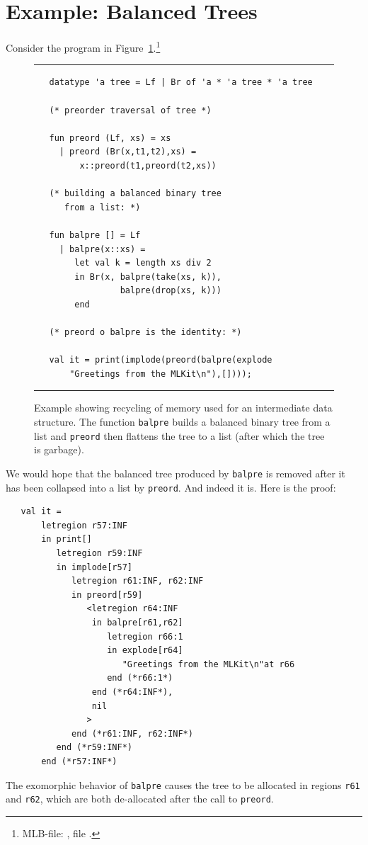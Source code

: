 \documentclass[12pt]{book}
\begin{document}
\section{Example: Balanced Trees}
Consider the program in Figure~\ref{balpre.fig}.\footnote{MLB-file:
  , file .}
\begin{figure} 
\hrule 
\medskip
\begin{verbatim}
   datatype 'a tree = Lf | Br of 'a * 'a tree * 'a tree

   (* preorder traversal of tree *)

   fun preord (Lf, xs) = xs
     | preord (Br(x,t1,t2),xs) = 
         x::preord(t1,preord(t2,xs))

   (* building a balanced binary tree 
      from a list: *)

   fun balpre [] = Lf
     | balpre(x::xs) = 
        let val k = length xs div 2
        in Br(x, balpre(take(xs, k)),
                 balpre(drop(xs, k)))
        end

   (* preord o balpre is the identity: *)

   val it = print(implode(preord(balpre(explode 
       "Greetings from the MLKit\n"),[])));
\end{verbatim}
\caption{Example showing recycling of memory used for an intermediate 
  data structure. The function {\tt balpre} builds a balanced binary
  tree from a list and {\tt preord} then flattens the tree to a list
  (after which the tree is garbage).}  
\medskip \hrule
\label{balpre.fig}
\end{figure}
We would hope that the balanced tree produced by {\tt balpre} is
removed after it has been collapsed into a list by {\tt preord}.  And
indeed it is. Here is the proof:
\begin{verbatim}
   val it = 
       letregion r57:INF 
       in print[] 
          letregion r59:INF 
          in implode[r57] 
             letregion r61:INF, r62:INF 
             in preord[r59] 
                <letregion r64:INF 
                 in balpre[r61,r62] 
                    letregion r66:1 
                    in explode[r64] 
                       "Greetings from the MLKit\n"at r66 
                    end (*r66:1*) 
                 end (*r64:INF*), 
                 nil
                > 
             end (*r61:INF, r62:INF*) 
          end (*r59:INF*) 
       end (*r57:INF*)
\end{verbatim}
The exomorphic behavior of {\tt balpre} causes the tree to be
allocated in regions {\tt r61} and {\tt r62}, which are both
de-allocated after the call to {\tt preord}.
\end{document}

